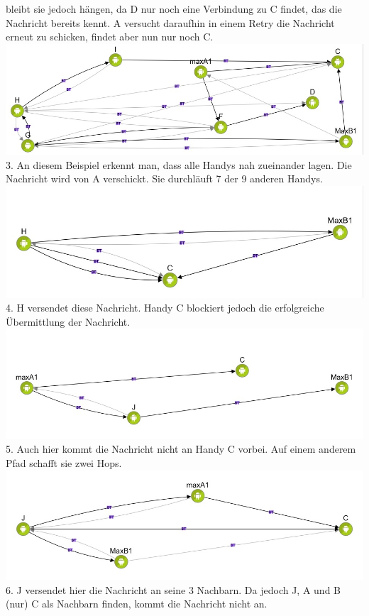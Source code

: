 bleibt sie jedoch hängen, da D nur noch eine Verbindung zu C findet, das
die Nachricht bereits kennt. A versucht daraufhin in einem Retry die
Nachricht erneut zu schicken, findet aber nun nur noch C.\\
\includegraphics[width=1.0\textwidth]{belege/grosstests/Bilder/Miserfolg4.jpg}\\ 3. An diesem
Beispiel erkennt man, dass alle Handys nah zueinander lagen. Die
Nachricht wird von A verschickt. Sie durchläuft 7 der 9 anderen Handys.\\
\includegraphics[width=1.0\textwidth]{belege/grosstests/Bilder/Miserfolg3.jpg}\\ 4. H versendet
diese Nachricht. Handy C blockiert jedoch die erfolgreiche Übermittlung
der Nachricht. \\
\includegraphics[width=1.0\textwidth]{belege/grosstests/Bilder/Miserfolg2.jpg}\\
5. Auch hier kommt die Nachricht nicht an Handy C vorbei. Auf einem
anderem Pfad schafft sie zwei Hops.\\
\includegraphics[width=1.0\textwidth]{belege/grosstests/Bilder/Miserfolg1.jpg}\\ 6. J versendet
hier die Nachricht an seine 3 Nachbarn. Da jedoch J, A und B (nur) C als
Nachbarn finden, kommt die Nachricht nicht an.\\\\

